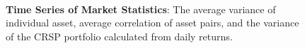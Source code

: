 \begin{landscape}
	\begin{figure}[!htb]
		\caption{{\bf Time Series of Market Statistics}: The average variance of individual asset, average correlation of asset pairs, and the variance of the CRSP portfolio calculated from daily returns.} \label{fig:time_series}
		\\
		
	\end{figure}
\end{landscape}
